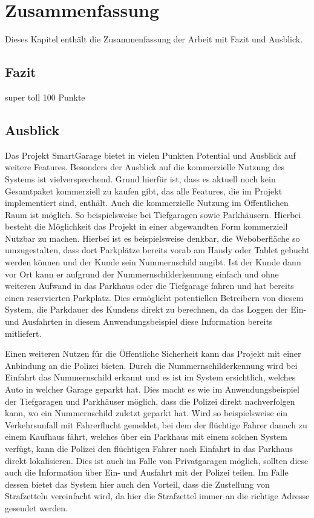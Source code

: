 \chapter{Zusammenfassung}

\nocite{*}

Dieses Kapitel enthält die Zusammenfassung der Arbeit mit Fazit und Ausblick.

\section{Fazit}

super toll 100 Punkte

\section{Ausblick}
Das Projekt SmartGarage bietet in vielen Punkten Potential und Ausblick auf weitere Features. Besonders der Ausblick auf die kommerzielle Nutzung des Systems ist vielversprechend. Grund hierfür ist, dass es aktuell noch kein Gesamtpaket kommerziell zu kaufen gibt, das alle Features, die im Projekt implementiert sind, enthält. Auch die kommerzielle Nutzung im Öffentlichen Raum ist möglich. So beispielsweise bei Tiefgaragen sowie Parkhäusern. Hierbei besteht die Möglichkeit das Projekt in einer abgewandten Form kommerziell Nutzbar zu machen. Hierbei ist es beispielsweise denkbar, die Weboberfläche so umzugestalten, dass dort Parkplätze bereits vorab am Handy oder Tablet gebucht werden können und der Kunde sein Nummernschild angibt. Ist der Kunde dann vor Ort kann er aufgrund der Nummernschilderkennung einfach und ohne weiteren Aufwand in das Parkhaus oder die Tiefgarage fahren und hat bereits einen reservierten Parkplatz. Dies ermöglicht potentiellen Betreibern von diesem System, die Parkdauer des Kundens direkt zu berechnen, da das Loggen der Ein- und Ausfahrten in diesem Anwendungsbeispiel diese Information bereits mitliefert. 

Einen weiteren Nutzen für die Öffentliche Sicherheit kann das Projekt mit einer Anbindung an die Polizei bieten. Durch die Nummernschilderkennung wird bei Einfahrt das Nummernschild erkannt und es ist im System ersichtlich, welches Auto in welcher Garage geparkt hat. Dies macht es wie im Anwendungsbeispiel der Tiefgaragen und Parkhäuser möglich, dass die Polizei direkt nachverfolgen kann, wo ein Nummernschild zuletzt geparkt hat. Wird so beispielsweise ein Verkehrsunfall mit Fahrerflucht gemeldet, bei dem der flüchtige Fahrer danach zu einem Kaufhaus fährt, welches über ein Parkhaus mit einem solchen System verfügt, kann die Polizei den flüchtigen Fahrer nach Einfahrt in das Parkhaus direkt lokalisieren. Dies ist auch im Falle von Privatgaragen möglich, sollten diese auch die Information über Ein- und Ausfahrt mit der Polizei teilen. Im Falle dessen bietet das System hier auch den Vorteil, dass die Zustellung von Strafzetteln vereinfacht wird, da hier die Strafzettel immer an die richtige Adresse gesendet werden.

